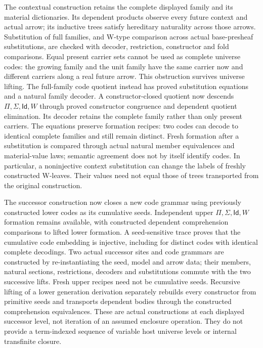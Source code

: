 \documentclass[11pt]{article}
\theoremstyle{definition}
\theoremstyle{remark}
\begin{document}
The contextual construction retains the complete displayed family and its
material dictionaries.  Its dependent products observe every future context
and actual arrow; its inductive trees satisfy hereditary naturality across
those arrows.  Substitution of full families, and W-type comparison across
actual base-presheaf substitutions, are checked with decoder, restriction,
constructor and fold comparisons.  Equal present carrier sets cannot be
used as complete universe codes: the growing family and the unit family
have the same carrier now and different carriers along a real future arrow.
This obstruction survives universe lifting.  The full-family code quotient
instead has proved substitution equations and a natural family decoder.
A constructor-closed quotient now descends $\Pi,\Sigma,\mathsf{Id},W$
through proved constructor congruence and dependent quotient elimination.
Its decoder retains the complete family rather than only present carriers.
The equations preserve formation recipes: two codes can decode to identical
complete families and still remain distinct.  Fresh formation after a
substitution is compared through actual natural member equivalences and
material-value laws; semantic agreement does not by itself identify codes.
In particular, a noninjective context substitution can change the labels of
freshly constructed W-leaves.  Their values need not equal those of trees
transported from the original construction.

The successor construction now closes a new code grammar using previously
constructed lower codes as its cumulative seeds.  Independent upper
$\Pi,\Sigma,\mathsf{Id},W$ formation remains available, with constructed
dependent comprehension comparisons to lifted lower formation.  A
seed-sensitive trace proves that the cumulative code embedding is injective,
including for distinct codes with identical complete decodings.  Two actual
successor sites and code grammars are constructed by re-instantiating the
seed, model and arrow data; their members, natural sections, restrictions,
decoders and substitutions commute with the two successive lifts.  Fresh
upper recipes need not be cumulative seeds.  Recursive lifting of a lower
generation derivation separately rebuilds every constructor from primitive
seeds and transports dependent bodies through the constructed comprehension
equivalences.  These are actual constructions at each displayed successor
level, not iteration of an assumed enclosure operation.  They do not provide
a term-indexed sequence of variable host universe levels or internal
transfinite closure.
\end{document}
